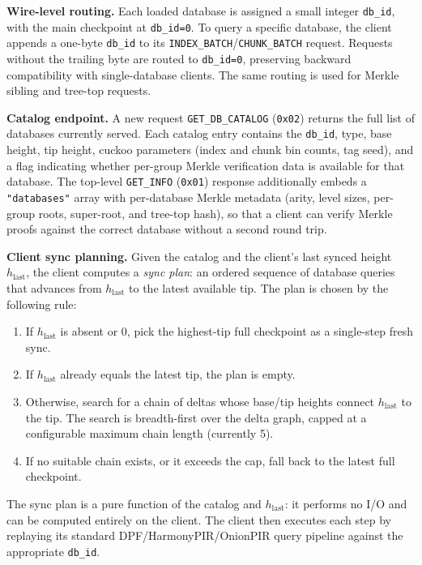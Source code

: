 \textbf{Wire-level routing.} Each loaded database is assigned a small integer \texttt{db\_id}, with the main checkpoint at \texttt{db\_id=0}. To query a specific database, the client appends a one-byte \texttt{db\_id} to its \texttt{INDEX\_BATCH}/\texttt{CHUNK\_BATCH} request. Requests without the trailing byte are routed to \texttt{db\_id=0}, preserving backward compatibility with single-database clients. The same routing is used for Merkle sibling and tree-top requests.

\textbf{Catalog endpoint.} A new request \texttt{GET\_DB\_CATALOG} (\texttt{0x02}) returns the full list of databases currently served. Each catalog entry contains the \texttt{db\_id}, type, base height, tip height, cuckoo parameters (index and chunk bin counts, tag seed), and a flag indicating whether per-group Merkle verification data is available for that database. The top-level \texttt{GET\_INFO} (\texttt{0x01}) response additionally embeds a \texttt{"databases"} array with per-database Merkle metadata (arity, level sizes, per-group roots, super-root, and tree-top hash), so that a client can verify Merkle proofs against the correct database without a second round trip.

\textbf{Client sync planning.} Given the catalog and the client's last synced height $h_\text{last}$, the client computes a \emph{sync plan}: an ordered sequence of database queries that advances from $h_\text{last}$ to the latest available tip. The plan is chosen by the following rule:
\begin{enumerate}[nolistsep,leftmargin=*]
    \item If $h_\text{last}$ is absent or $0$, pick the highest-tip full checkpoint as a single-step fresh sync.
    \item If $h_\text{last}$ already equals the latest tip, the plan is empty.
    \item Otherwise, search for a chain of deltas whose base/tip heights connect $h_\text{last}$ to the tip. The search is breadth-first over the delta graph, capped at a configurable maximum chain length (currently 5).
    \item If no suitable chain exists, or it exceeds the cap, fall back to the latest full checkpoint.
\end{enumerate}
The sync plan is a pure function of the catalog and $h_\text{last}$: it performs no I/O and can be computed entirely on the client. The client then executes each step by replaying its standard DPF/HarmonyPIR/OnionPIR query pipeline against the appropriate \texttt{db\_id}.

